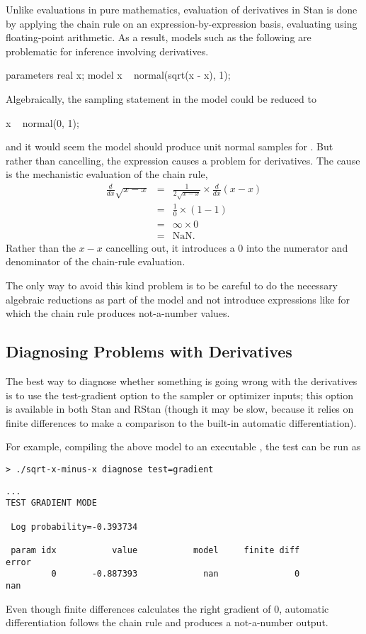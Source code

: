 Unlike evaluations in pure mathematics, evaluation of derivatives in
Stan is done by applying the chain rule on an expression-by-expression
basis, evaluating using floating-point arithmetic.  As a result,
models such as the following are problematic for inference involving
derivatives.
%
\begin{stancode}
parameters {
  real x;
}
model {
  x ~ normal(sqrt(x - x), 1);
}
\end{stancode}
%
Algebraically, the sampling statement in the model could be reduced to
%
\begin{stancode}
  x ~ normal(0, 1);
\end{stancode}
%
and it would seem the model should produce unit normal samples for
.  But rather than cancelling, the expression  causes a problem for derivatives.  The cause is the mechanistic
evaluation of the chain rule,
%
\begin{eqnarray*}
\frac{d}{dx} \sqrt{x - x}
& = &
\frac{1}{2 \sqrt{x - x}} \times \frac{d}{dx} (x - x)
\\[4pt]
& = &
\frac{1}{0} \times (1 - 1)
\\[4pt]
& = &
\infty \times 0
\\[4pt]
& = & \mbox{NaN}.
\end{eqnarray*}
%
Rather than the $x - x$ cancelling out, it introduces a 0 into the
numerator and denominator of the chain-rule evaluation.

The only way to avoid this kind problem is to be careful to do the
necessary algebraic reductions as part of the model and not introduce
expressions like  for which the chain rule produces
not-a-number values.

\subsection{Diagnosing Problems with Derivatives}

The best way to diagnose whether something is going wrong with the
derivatives is to use the test-gradient option to the sampler or
optimizer inputs; this option is available in both Stan and RStan
(though it may be slow, because it relies on finite differences to
make a comparison to the built-in automatic differentiation).

For example, compiling the above model to an executable
, the test can be run as
%
\begin{Verbatim}
> ./sqrt-x-minus-x diagnose test=gradient
\end{Verbatim}
\begin{Verbatim}[fontsize=\small]
...
TEST GRADIENT MODE

 Log probability=-0.393734

 param idx           value           model     finite diff           error
         0       -0.887393             nan               0             nan
\end{Verbatim}
%
Even though finite differences calculates the right gradient of 0,
automatic differentiation follows the chain rule and produces a
not-a-number output.

